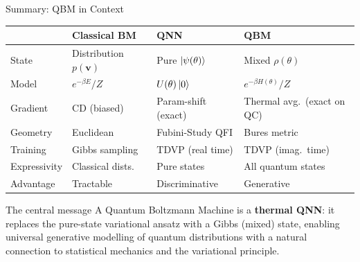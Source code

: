 \documentclass[aspectratio=169,10pt]{beamer}
\begin{document}
\begin{frame}{Summary: QBM in Context}
  \begin{center}
  \renewcommand{\arraystretch}{1.3}
  \begin{tabular}{p{2.8cm}p{3.2cm}p{3.2cm}p{3.2cm}}
    \toprule
    & \textbf{Classical BM} & \textbf{QNN} & \textbf{QBM} \\
    \midrule
    State & Distribution $p(\mathbf{v})$ & Pure $\ket{\psi(\theta)}$
          & Mixed $\rho(\theta)$ \\
    Model & $e^{-\beta E}/Z$ & $U(\theta)\ket{0}$
          & $e^{-\beta H(\theta)}/Z$ \\
    Gradient & CD (biased) & Param-shift (exact)
             & Thermal avg.\ (exact on QC) \\
    Geometry & Euclidean & Fubini-Study QFI
             & Bures metric \\
    Training & Gibbs sampling & TDVP (real time)
             & TDVP (imag.\ time) \\
    Expressivity & Classical dists. & Pure states
                 & All quantum states \\
    Advantage & Tractable & Discriminative & Generative \\
    \bottomrule
  \end{tabular}
  \end{center}

  \vspace{0.3cm}
  \begin{alertblock}{The central message}
    A Quantum Boltzmann Machine is a \textbf{thermal QNN}:
    it replaces the pure-state variational ansatz with a
    Gibbs (mixed) state, enabling universal generative
    modelling of quantum distributions with a natural
    connection to statistical mechanics and the
    variational principle.
  \end{alertblock}
\end{frame}
\end{document}
